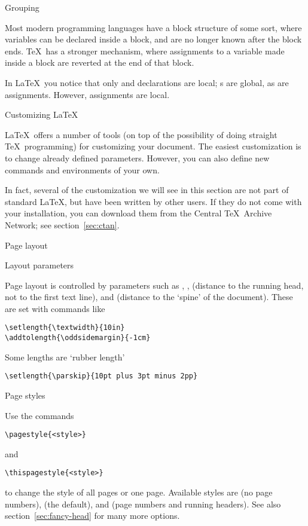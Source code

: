  {Grouping}

Most modern programming languages have a block structure of some sort,
where variables can be declared inside a block, and are no longer
known after the block ends. \TeX\ has a stronger mechanism, where
assignments to a  variable made inside a block are reverted at
the end of that block.

In \LaTeX\ you notice that only  and
 declarations are local; s are
global, as are  assignments. However, 
assignments are local.

 {Customizing \LaTeX}

\LaTeX\ offers a number of tools (on top of the possibility of doing
straight \TeX\ programming) for customizing your document. The easiest
customization is to change already defined parameters. However, you
can also define new commands and environments of your own.

In fact, several of the customization we will see in this section are
not part of standard \LaTeX, but have been written by other users. If
they do not come with your installation, you can download them from
the Central \TeX\ Archive Network; see section~\ref{sec:ctan}.

 {Page layout}

 {Layout parameters}
\label{sec:page-layout}

Page layout is controlled by parameters such as ,
,  (distance to the running head, not to
the first text line), and  (distance to the
`spine' of the document). These are set with commands like
\begin{verbatim}
\setlength{\textwidth}{10in}
\addtolength{\oddsidemargin}{-1cm}
\end{verbatim}
Some lengths are `rubber length'
\begin{verbatim}
\setlength{\parskip}{10pt plus 3pt minus 2pp}
\end{verbatim}

 {Page styles}
\label{sec:page}

Use the commands
\begin{verbatim}
\pagestyle{<style>}
\end{verbatim}
and
\begin{verbatim}
\thispagestyle{<style>}
\end{verbatim}
to change the style of all pages or
one page. Available styles are  (no page numbers), 
(the default), and  (page numbers and running
headers). See also section~\ref{sec:fancy-head} for many more options.

